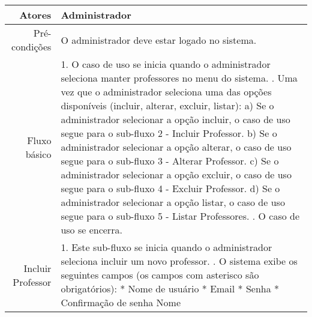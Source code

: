 \begin{longtable}{r p{12cm}}
\hline
Atores & Administrador \\ \hline
Pré-condições & O administrador deve estar logado no sistema.\\ \hline
Fluxo básico &1. O caso de uso se inicia quando o administrador seleciona manter professores no menu do sistema. \newline
                2. Uma vez que o administrador seleciona uma das opções disponíveis (incluir, alterar, excluir, listar): \newline
                \hspace*{1cm} a) Se o administrador selecionar a opção incluir, o caso de uso segue para o sub-fluxo 2 - Incluir Professor. \newline 
                \hspace*{1cm} b) Se o administrador selecionar a opção alterar, o caso de uso segue para o sub-fluxo 3 - Alterar Professor.  \newline 
                \hspace*{1cm} c) Se o administrador selecionar a opção excluir, o caso de uso segue para o sub-fluxo 4 - Excluir Professor.  \newline 
                \hspace*{1cm} d) Se o administrador selecionar a opção listar, o caso de uso segue para o sub-fluxo 5 - Listar Professores.  \newline 
                3. O caso de uso se encerra. \newline \\
Incluir Professor & 1. Este sub-fluxo se inicia quando o administrador seleciona incluir um novo professor. \newline
                    2. O sistema exibe os seguintes campos (os campos com asterisco são obrigatórios): \newline
                    \hspace*{1cm} * Nome de usuário \newline
                    \hspace*{1cm} * Email \newline
                    \hspace*{1cm} * Senha \newline
                    \hspace*{1cm} * Confirmação de senha \newline
                    \hspace*{1cm} Nome \newline

\end{longtable}
